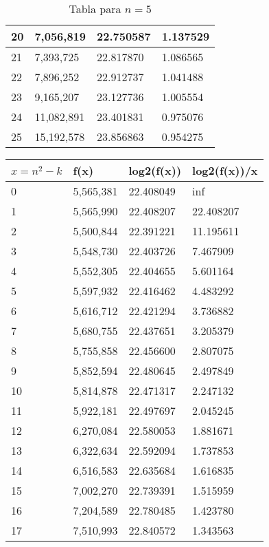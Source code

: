 \begin{table}[H]
{\begin{tabular}{| l | l | l | l |}
    20	&7,056,819	&22.750587	&1.137529			\\ \hline
    21	&7,393,725	&22.817870	&1.086565			\\ \hline
    22	&7,896,252	&22.912737	&1.041488			\\ \hline
    23	&9,165,207	&23.127736	&1.005554			\\ \hline
    24	&11,082,891	&23.401831	&0.975076			\\ \hline
    25	&15,192,578	&23.856863	&0.954275			\\ \hline
  \end{tabular}
  \caption*{Tabla para $n=5$}
}
\end{table}

\begin{table}[H]
\parbox{0.3\textwidth}{
    \begin{tabular}{| l | l | l | l |}
    \hline
    $x=n^2-k$ & f(x) & log2(f(x)) & log2(f(x))/x 	\\ \hline
    0	&5,565,381	&22.408049	&inf \\ \hline
    1	&5,565,990	&22.408207	&22.408207 \\ \hline
    2	&5,500,844	&22.391221	&11.195611 \\ \hline
    3	&5,548,730	&22.403726	&7.467909 \\ \hline
    4	&5,552,305	&22.404655	&5.601164 \\ \hline
    5	&5,597,932	&22.416462	&4.483292 \\ \hline
    6	&5,616,712	&22.421294	&3.736882 \\ \hline
    7	&5,680,755	&22.437651	&3.205379 \\ \hline
    8	&5,755,858	&22.456600	&2.807075 \\ \hline
    9	&5,852,594	&22.480645	&2.497849 \\ \hline
    10	&5,814,878	&22.471317	&2.247132 \\ \hline
    11	&5,922,181	&22.497697	&2.045245 \\ \hline
    12	&6,270,084	&22.580053	&1.881671 \\ \hline
    13	&6,322,634	&22.592094	&1.737853 \\ \hline
    14	&6,516,583	&22.635684	&1.616835 \\ \hline
    15	&7,002,270	&22.739391	&1.515959 \\ \hline
    16	&7,204,589	&22.780485	&1.423780 \\ \hline
    17	&7,510,993	&22.840572	&1.343563 \\ \hline

\end{tabular}}
\end{table}
